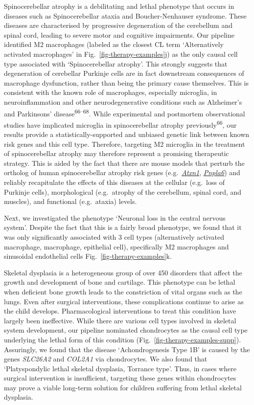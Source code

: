 \documentclass[
]{article}
\begin{document}
Spinocerebellar atrophy is a debilitating and lethal phenotype that
occurs in diseases such as Spinocerebellar ataxia and Boucher-Nenhauser
syndrome. These diseases are characterised by progressive degeneration
of the cerebellum and spinal cord, leading to severe motor and cognitive
impairments. Our pipeline identified M2 macrophages (labeled as the
closest CL term `Alternatively activated macrophages' in
Fig.~\ref{fig-therapy-examples}j) as the only causal cell type
associated with `Spinocerebellar atrophy'. This strongly suggests that
degeneration of cerebellar Purkinje cells are in fact downstream
consequences of macrophage dysfunction, rather than being the primary
cause themselves. This is consistent with the known role of macrophages,
especially microglia, in neuroinflammation and other neurodegenerative
conditions such as Alzheimer's and Parkinsons'
disease\textsuperscript{66--68}. While experimental and postmortem
observational studies have implicated microglia in spinocerebellar
atrophy previously\textsuperscript{66}, our results provide a
statistically-supported and unbiased genetic link between known risk
genes and this cell type. Therefore, targeting M2 microglia in the
treatment of spinocerebellar atrophy may therefore represent a promising
therapeutic strategy. This is aided by the fact that there are mouse
models that perturb the ortholog of human spinocerebellar atrophy risk
genes
(e.g.~\href{https://www.informatics.jax.org/marker/MGI:104783}{\emph{Atxn1}},
\href{https://www.informatics.jax.org/marker/MGI:1354723}{\emph{Pnpla6}})
and reliably recapitulate the effects of this diseases at the cellular
(e.g.~loss of Purkinje cells), morphological (e.g.~atrophy of the
cerebellum, spinal cord, and muscles), and functional (e.g.~ataxia)
levels.

Next, we investigated the phenotype `Neuronal loss in the central
nervous system'. Despite the fact that this is a fairly broad phenotype,
we found that it was only significantly associated with 3 cell types
(alternatively activated macrophage, macrophage, epithelial cell),
specifically M2 macrophages and sinusoidal endothelial cells
Fig.~\ref{fig-therapy-examples}k.

Skeletal dysplasia is a heterogeneous group of over 450 disorders that
affect the growth and development of bone and cartilage. This phenotype
can be lethal when deficient bone growth leads to the constriction of
vital organs such as the lungs. Even after surgical interventions, these
complications continue to arise as the child develops. Pharmacological
interventions to treat this condition have largely been ineffective.
While there are various cell types involved in skeletal system
development, our pipeline nominated chondrocytes as the causal cell type
underlying the lethal form of this condition
(Fig.~\ref{fig-therapy-examples-supp}). Assuringly, we found that the
disease `Achondrogenesis Type 1B' is caused by the genes \emph{SLC26A2}
and \emph{COL2A1} via chondrocytes. We also found that `Platyspondylic
lethal skeletal dysplasia, Torrance type'. Thus, in cases where surgical
intervention is insufficient, targeting these genes within chondrocytes
may prove a viable long-term solution for children suffering from lethal
skeletal dysplasia.
\end{document}
